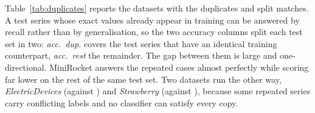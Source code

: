 Table~\ref{tab:duplicates} reports the datasets with the duplicates and split matches. A test
series whose exact values already appear in training can be answered by recall rather than
by generalisation, so the two accuracy columns split each test set in two: \emph{acc.\
dup.} covers the test series that have an identical training counterpart, \emph{acc.\
rest} the remainder. The gap between them is large and one-directional. MiniRocket answers the repeated cases almost perfectly while scoring far lower on the rest of the same test set. Two datasets run the other way, \emph{ElectricDevices} (\accDupElectricDevices against \accRestElectricDevices) and \emph{Strawberry} (\accDupStrawberry against \accRestStrawberry), because some repeated series carry conflicting labels and no classifier can satisfy every copy.
  {\footnotesize\setlength{\tabcolsep}{3pt}}             


